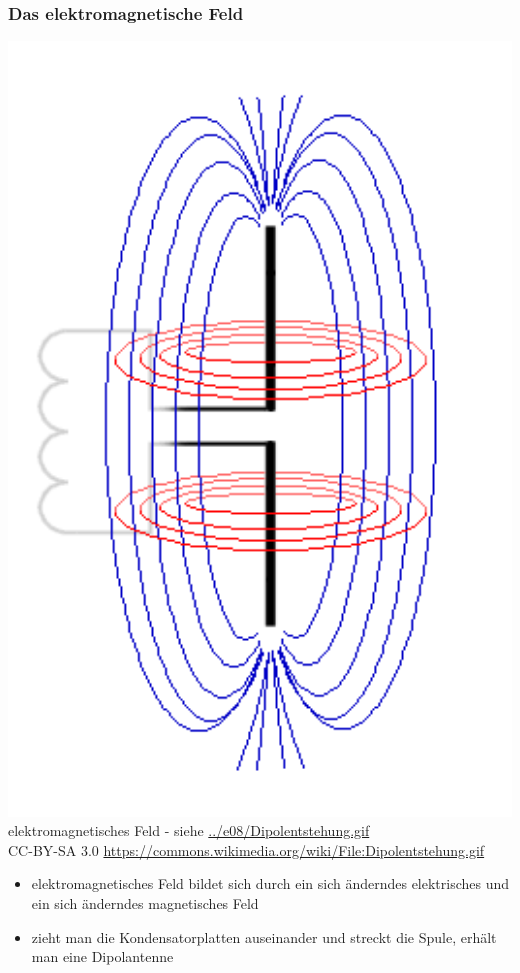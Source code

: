 \begin{frame}
  \frametitle{Das elektromagnetische Feld}
  \begin{center}
    \includegraphics[width=1\textwidth,height=.5\textheight,keepaspectratio]{e08/Dipolentstehung-11.png}\\
    {\tiny elektromagnetisches Feld - siehe \url{../e08/Dipolentstehung.gif} \\
    {\tiny CC-BY-SA 3.0 \url{https://commons.wikimedia.org/wiki/File:Dipolentstehung.gif}}}
  \end{center}
  \begin{itemize}
    \item elektromagnetisches Feld bildet sich durch ein sich änderndes elektrisches und ein sich änderndes magnetisches Feld
    \item zieht man die Kondensatorplatten auseinander und streckt die Spule, erhält man eine Dipolantenne 
  \end{itemize}
\end{frame}

